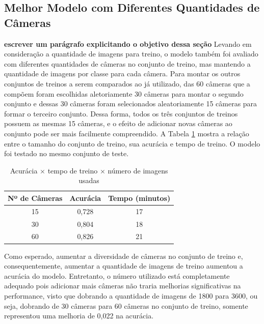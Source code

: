 \subsection{Melhor Modelo com Diferentes Quantidades de Câmeras}\label{sec:cameraquantity}

\textbf{escrever um parágrafo explicitando o objetivo dessa seção}
Levando em consideração a quantidade de imagens para treino, o modelo também foi avaliado com diferentes quantidades de câmeras no conjunto de treino, 
mas mantendo a quantidade de imagens por classe para cada câmera.
Para montar os outros conjuntos de treinos a serem comparados ao já utilizado, das 60 câmeras que a compõem foram escolhidas aletoriamente 30 câmeras para montar o segundo conjunto
e dessas 30 câmeras foram selecionados aleatoriamente 15 câmeras para formar o terceiro conjunto.
Dessa forma, todos os três conjuntos de treinos possuem as mesmas 15 câmeras, e o efeito de adicionar novas câmeras ao conjunto pode ser mais facilmente compreendido.
A Tabela \ref{tab:trainingimages} mostra a relação entre o tamanho do conjunto de treino, sua acurácia e tempo de treino. O modelo foi testado no mesmo conjunto de teste.

\begin{table}[!ht]
\begin{center}
\caption{Acurácia $\times$ tempo de treino $\times$ número de imagens usadas}
\label{tab:trainingimages}
\begin{tabular}{c|cc}
\toprule
\textbf{\textbf{Nº de Câmeras}} & \textbf{Acurácia} & \textbf{Tempo (minutos)}\\
\midrule
15 &  0,728 & 17\\
30 & 0,804 & 18 \\
60 & 0,826 & 21 \\
\bottomrule
\end{tabular}
\end{center}
\end{table}

Como esperado, aumentar a diversidade de câmeras no conjunto de treino e, consequentemente, aumentar a quantidade de imagens de treino aumentou a acurácia do modelo. 
Entretanto, o número utilizado está completamente adequado pois adicionar mais câmeras não traria melhorias significativas na performance, 
visto que dobrando a quantidade de imagens de 1800 para 3600, ou seja, dobrando de 30 câmeras para 60 câmeras no conjunto de treino, somente representou uma melhoria de 0,022 na acurácia.

